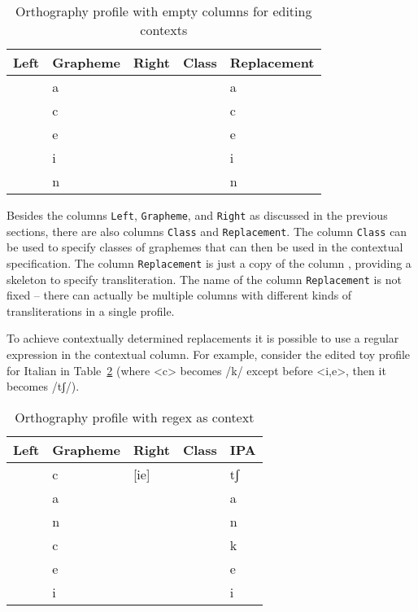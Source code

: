 \documentclass[output=inprep,
		biblatex
		]{LSP/langsci}\usepackage[]{graphicx}\usepackage[]{color}
\begin{document}
\begin{table}[htb]
\centering
\begingroup\scriptsize
\begin{tabular}{lllll}
  \toprule
Left & Grapheme & Right & Class & Replacement \\ 
  \midrule
 & a &  &  & a \\ 
   & c &  &  & c \\ 
   & e &  &  & e \\ 
   & i &  &  & i \\ 
   & n &  &  & n \\ 
   \bottomrule
\end{tabular}
\endgroup
\caption{Orthography profile with empty columns for editing contexts} 
\label{tab:profile_editing_1}
\end{table}


Besides the columns \texttt{Left}, \texttt{Grapheme}, and \texttt{Right} as
discussed in the previous sections, there are also columns \texttt{Class} and
\texttt{Replacement}. The column \texttt{Class} can be used to specify classes
of graphemes that can then be used in the contextual specification. The column
\texttt{Replacement} is just a copy of the column , providing a
skeleton to specify transliteration. The name of the column
\texttt{Replacement} is not fixed -- there can actually be multiple columns with 
different kinds of transliterations in a single profile.

To achieve contextually determined replacements it is possible to use a regular
expression in the contextual column. For example, consider the edited toy
profile for Italian in Table~\ref{tab:profile_editing_2} (where <c> becomes /k/
except before <i,e>, then it becomes /tʃ/). 

\begin{table}[htb]
\centering
\begingroup\scriptsize
\begin{tabular}{lllll}
  \toprule
Left & Grapheme & Right & Class & IPA \\ 
  \midrule
 & c & [ie] &  & tʃ \\ 
   & a &  &  & a \\ 
   & n &  &  & n \\ 
   & c &  &  & k \\ 
   & e &  &  & e \\ 
   & i &  &  & i \\ 
   \bottomrule
\end{tabular}
\endgroup
\caption{Orthography profile with regex as context} 
\label{tab:profile_editing_2}
\end{table}
\end{document}
